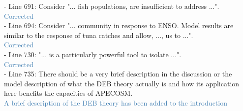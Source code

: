 \documentclass[12pt]{article}
\newcommand{\resp}[1]{\textcolor{SteelBlue}{#1}}
\begin{document}
- Line 691: Consider "... fish populations, are insufficient to address ...".\\

\resp{Corrected}  \\

- Line 694: Consider "... community in response to ENSO. Model results are similar to the response of tuna catches and allow, ..., us to ...".\\

\resp{Corrected} \\

- Line 730: "... is a particularly powerful tool to isolate ...".\\

\resp{Corrected} \\

- Line 735: There should be a very brief description in the discussion or the model description of what the DEB theory actually is and how its application here benefits the capacities of APECOSM.\\

\resp{A brief description of the DEB theory has been added to the introduction}


\end{document}
